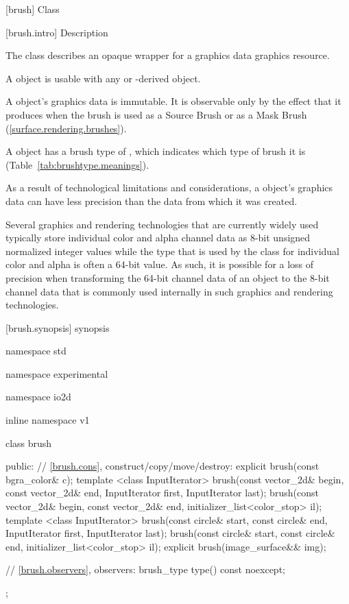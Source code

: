  [brush] {Class }

 [brush.intro] { Description}

\pnum
{}
The class  describes an opaque wrapper for a graphics data graphics resource.

\pnum
A  object is usable with any  or -derived object.

\pnum
A  object's graphics data is immutable. It is observable only by the effect that it produces when the brush is used as a Source Brush or as a Mask Brush (\ref{surface.rendering.brushes}).

\pnum
A  object has a brush type of , which indicates which type of brush it is (Table~\ref{tab:brushtype.meanings}).

\pnum
As a result of technological limitations and considerations, a  object's graphics data can have less precision than the data from which it was created.

\pnum
\begin{example}
Several graphics and rendering technologies that are currently widely used typically store individual color and alpha channel data as 8-bit unsigned normalized integer values while the  type that is used by the  class for individual color and alpha is often a 64-bit value. As such, it is possible for a loss of precision when transforming the 64-bit channel data of an  object to the 8-bit channel data that is commonly used internally in such graphics and rendering technologies.
\end{example}

 [brush.synopsis] { synopsis}

\begin{codeblock}
namespace std { namespace experimental { namespace io2d { inline namespace v1 {
  class brush {
  public:
    // \ref{brush.cons}, construct/copy/move/destroy:
    explicit brush(const bgra_color& c);
    template <class InputIterator>
    brush(const vector_2d& begin, const vector_2d& end,
      InputIterator first, InputIterator last);
    brush(const vector_2d& begin, const vector_2d& end,
      initializer_list<color_stop> il);
    template <class InputIterator>
    brush(const circle& start, const circle& end,
      InputIterator first, InputIterator last);
    brush(const circle& start, const circle& end,
      initializer_list<color_stop> il);
    explicit brush(image_surface&& img);

    // \ref{brush.observers}, observers:
    brush_type type() const noexcept;
  };
} } } }
\end{codeblock}

